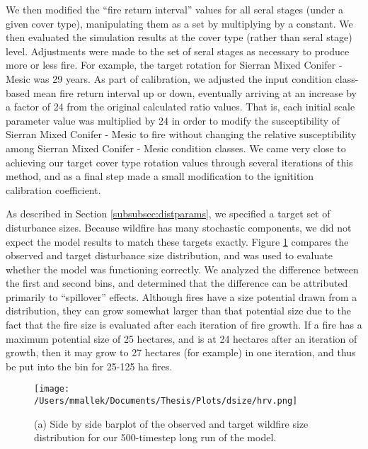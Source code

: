 We then modified the ``fire return interval'' values for all seral stages (under a given cover type), manipulating them as a set by multiplying by a constant. We then evaluated the simulation results at the cover type (rather than seral stage) level. Adjustments were made to the set of seral stages as necessary to produce more or less fire. For example, the target rotation for Sierran Mixed Conifer - Mesic was 29 years. As part of calibration, we adjusted the input condition class-based mean fire return interval up or down, eventually arriving at an increase by a factor of 24 from the original calculated ratio values. That is, each initial scale parameter value was multiplied by 24 in order to modify the susceptibility of Sierran Mixed Conifer - Mesic to fire without changing the relative susceptibility among Sierran Mixed Conifer - Mesic condition classes. We came very close to achieving our target cover type rotation values through several iterations of this method, and as a final step made a small modification to the ignitition calibration coefficient.

As described in Section \ref{subsubsec:distparams}, we specified a target set of disturbance sizes. Because wildfire has many stochastic components, we did not expect the model results to match these targets exactly. Figure \ref{fig:dsize} compares the observed and target disturbance size distribution, and was used to evaluate whether the model was functioning correctly. We analyzed the difference between the first and second bins, and determined that the difference can be attributed primarily to ``spillover'' effects. Although fires have a size potential drawn from a distribution, they can grow somewhat larger than that potential size due to the fact that the fire size is evaluated after each iteration of fire growth. If a fire has a maximum potential size of 25 hectares, and is at 24 hectares after an iteration of growth, then it may grow to 27 hectares (for example) in one iteration, and thus be put into the bin for 25-125 ha fires.

\begin{figure}[!htbp]
  \centering
    \centering
    \texttt{[image: /Users/mmallek/Documents/Thesis/Plots/dsize/hrv.png]}
  \caption{(a) Side by side barplot of the observed and target wildfire size distribution for our 500-timestep long run of the model.}
  \label{fig:dsize}
\end{figure}

